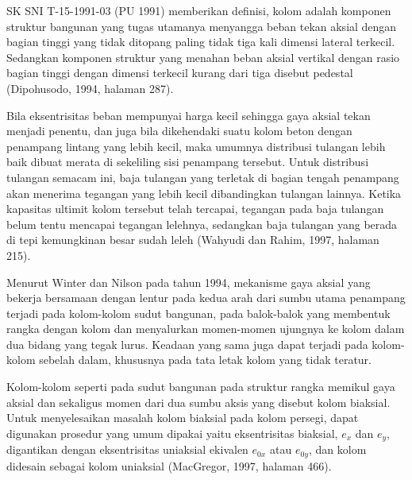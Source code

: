 SK SNI T-15-1991-03 (PU 1991) memberikan definisi, kolom adalah komponen
struktur bangunan yang tugas utamanya menyangga beban tekan aksial dengan
bagian tinggi yang tidak ditopang paling tidak tiga kali dimensi lateral
terkecil. Sedangkan komponen struktur yang menahan beban aksial vertikal
dengan rasio bagian tinggi dengan dimensi terkecil kurang dari tiga
disebut pedestal (Dipohusodo, 1994, halaman 287).

Bila eksentrisitas beban mempunyai harga kecil sehingga gaya aksial tekan
menjadi penentu, dan juga bila dikehendaki suatu kolom beton dengan
penampang lintang yang lebih kecil, maka umumnya distribusi tulangan
lebih baik dibuat merata di sekeliling sisi penampang tersebut. Untuk
distribusi tulangan semacam ini, baja tulangan yang terletak di bagian
tengah penampang akan menerima tegangan yang lebih kecil dibandingkan
tulangan lainnya. Ketika kapasitas ultimit kolom tersebut telah tercapai,
tegangan pada baja tulangan belum tentu mencapai tegangan lelehnya,
sedangkan baja tulangan yang berada di tepi kemungkinan besar sudah leleh
(Wahyudi dan Rahim, 1997, halaman 215).

Menurut Winter dan Nilson pada tahun 1994, mekanisme gaya aksial yang
bekerja bersamaan dengan lentur pada kedua arah dari sumbu utama penampang
terjadi pada kolom-kolom sudut bangunan, pada balok-balok yang membentuk
rangka dengan kolom dan menyalurkan momen-momen ujungnya ke kolom dalam
dua bidang yang tegak lurus. Keadaan yang sama juga dapat terjadi pada
kolom-kolom sebelah dalam, khususnya pada tata letak kolom yang tidak
teratur.

Kolom-kolom seperti pada sudut bangunan pada struktur rangka memikul gaya
aksial dan sekaligus momen dari dua sumbu aksis yang disebut kolom
biaksial. Untuk menyelesaikan masalah kolom biaksial pada kolom persegi,
dapat digunakan prosedur yang umum dipakai yaitu eksentrisitas biaksial,
$e_x$ dan $e_y$, digantikan dengan eksentrisitas uniaksial ekivalen
$e_{0x}$ atau $e_{0y}$, dan kolom didesain sebagai kolom uniaksial
(MacGregor, 1997, halaman 466).

